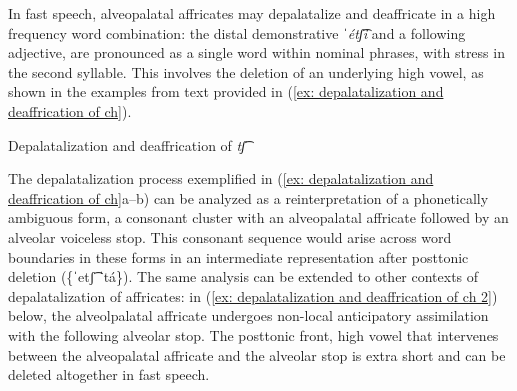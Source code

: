 In fast speech, alveopalatal affricates may depalatalize and deaffricate in a high frequency word combination: the distal demonstrative \textit{ˈétʃ͡i} and a following adjective, are pronounced as a single word within nominal phrases, with stress in the second syllable. This involves the deletion of an underlying high vowel, as shown in the examples from text provided in (\ref{ex: depalatalization and deaffrication of ch}).

\ea\label{ex: depalatalization and deaffrication of ch}
{Depalatalization and deaffrication of \textit{tʃ͡}}

    \z
\z

The depalatalization process exemplified in (\ref{ex: depalatalization and deaffrication of ch}a--b) can be analyzed as a reinterpretation of a phonetically ambiguous form, a consonant cluster with an alveo\-pal\-atal affricate followed by an alveolar voiceless stop. This consonant sequence would arise across word boundaries in these forms in an intermediate representation after posttonic deletion (\{ˈetʃ͡ ˈtá\}). The same analysis can be extended to other contexts of depalatalization of affricates: in (\ref{ex: depalatalization and deaffrication of ch 2}) below, the alveolpalatal affricate undergoes non-local anticipatory assimilation with the following alveolar stop. The posttonic front, high vowel that intervenes between the alveopalatal affricate and the alveolar stop is extra short and can be deleted altogether in fast speech.

